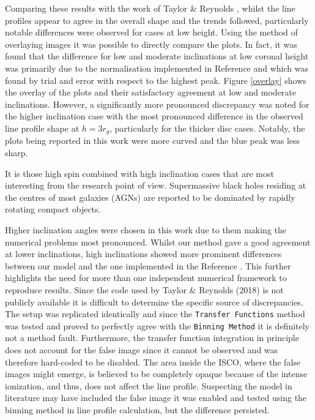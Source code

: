 \documentclass[fleqn,usenatbib,useAMS]{mnras}
\begin{document}
Comparing these results with the work of Taylor \& Reynolds \cite{taylor2018exploring}, whilst the line profiles appear to agree in the overall shape and the trends followed, particularly notable differences were observed for cases at low height. Using the method of overlaying images it was possible to directly compare the plots. In fact, it was found that the difference for low and moderate inclinations at low coronal height was primarily due to the normalisation implemented in Reference \cite{taylor2018exploring} and which was found by trial and error with respect to the highest peak. Figure \ref{overlay} shows the overlay of the plots and their satisfactory agreement at low and moderate inclinations. However, a significantly more pronounced discrepancy was noted for the higher inclination case with the most pronounced difference in the observed line profile shape at $h=3 r_{g}$, particularly for the thicker disc cases. Notably, the plots being reported in this work were more curved and the blue peak was less sharp. 

It is those high spin combined with high inclination cases that are most interesting from the research point of view. Supermassive black holes residing at the centres of most galaxies (AGNs) are reported to be dominated by rapidly rotating compact objects\cite{reynolds2015measuring}.

Higher inclination angles were chosen in this work due to them making the numerical problems most pronounced. Whilst our method gave a good agreement at lower inclinations, high inclinations showed more prominent differences between our model and the one implemented in the Reference \cite{taylor2018exploring}. This further highlights the need for more than one independent numerical framework to reproduce results. Since the code used by Taylor \& Reynolds (2018) \cite{taylor2018exploring} is not publicly available it is difficult to determine the specific source of discrepancies. The setup was replicated identically and since the {\tt Transfer Functions} method was tested and proved to perfectly agree with the {\tt Binning Method} it is definitely not a method fault. Furthermore, the transfer function integration in principle does not account for the false image since it cannot be observed and was therefore hard-coded to be disabled. The area inside the ISCO, where the false images might emerge, is believed to be completely opaque because of the intense ionization, and thus, does not affect the line profile. Suspecting the model in literature may have included the false image it was enabled and tested using the binning method in line profile calculation, but the difference persisted.
\end{document}
